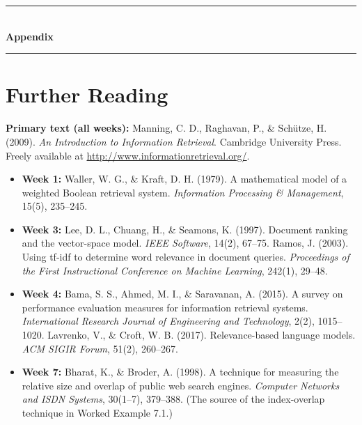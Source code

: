 \documentclass[11pt, a4paper]{article}
\begin{document}
\clearpage
{}
{}
\begin{center}
\rule{0.9\textwidth}{1pt}\\[4pt]
{\Huge\bfseries\color{primary} Appendix}\\[4pt]
\rule{0.9\textwidth}{1pt}
\end{center}
\vspace{1em}

\section*{Further Reading}

\textbf{Primary text (all weeks):} Manning, C. D., Raghavan, P., \& Sch\"utze, H. (2009). \textit{An Introduction to Information Retrieval}. Cambridge University Press. Freely available at \url{http://www.informationretrieval.org/}.

\begin{itemize}
  \item \textbf{Week 1:} Waller, W. G., \& Kraft, D. H. (1979). A mathematical model of a weighted Boolean retrieval system. \textit{Information Processing \& Management}, 15(5), 235--245.
  \item \textbf{Week 3:} Lee, D. L., Chuang, H., \& Seamons, K. (1997). Document ranking and the vector-space model. \textit{IEEE Software}, 14(2), 67--75. \quad Ramos, J. (2003). Using tf-idf to determine word relevance in document queries. \textit{Proceedings of the First Instructional Conference on Machine Learning}, 242(1), 29--48.
  \item \textbf{Week 4:} Bama, S. S., Ahmed, M. I., \& Saravanan, A. (2015). A survey on performance evaluation measures for information retrieval systems. \textit{International Research Journal of Engineering and Technology}, 2(2), 1015--1020. \quad Lavrenko, V., \& Croft, W. B. (2017). Relevance-based language models. \textit{ACM SIGIR Forum}, 51(2), 260--267.
  \item \textbf{Week 7:} Bharat, K., \& Broder, A. (1998). A technique for measuring the relative size and overlap of public web search engines. \textit{Computer Networks and ISDN Systems}, 30(1--7), 379--388. (The source of the index-overlap technique in Worked Example 7.1.)
\end{itemize}
\end{document}
